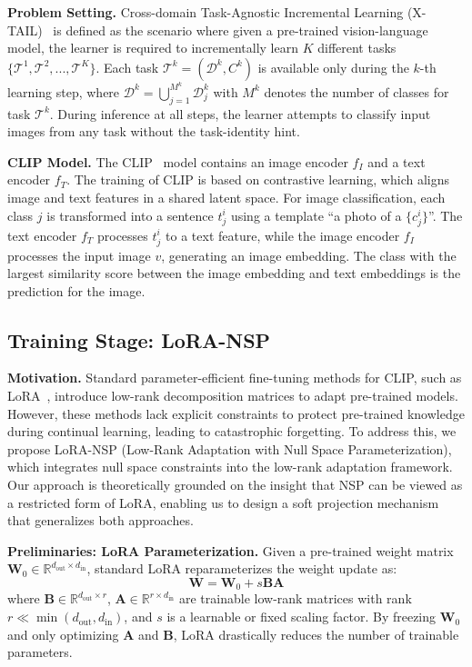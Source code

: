 \documentclass{article}
\begin{document}
\textbf{Problem Setting.}
Cross-domain Task-Agnostic Incremental Learning (X-TAIL)~\cite{xu2024rail} is defined as the scenario where given a pre-trained vision-language model, the learner is required to incrementally learn $K$ different tasks $\{\mathcal{T}^1, \mathcal{T}^2, ..., \mathcal{T}^K\}$. Each task $\mathcal{T}^k = (\mathcal{D}^k, C^k)$ is available only during the $k$-th learning step, where $\mathcal{D}^k = \bigcup_{j=1}^{M^k} \mathcal{D}_j^k$ with $M^k$ denotes the number of classes for task $\mathcal{T}^k$. During inference at all steps, the learner attempts to classify input images from any task without the task-identity hint.

\textbf{CLIP Model.}
The CLIP~\cite{radford2021learning} model contains an image encoder $f_I$ and a text encoder $f_T$. The training of CLIP is based on contrastive learning, which aligns image and text features in a shared latent space. For image classification, each class $j$ is transformed into a sentence $t_j^i$ using a template ``a photo of a $\{c_j^i\}$''. The text encoder $f_T$ processes $t_j^i$ to a text feature, while the image encoder $f_I$ processes the input image $v$, generating an image embedding. The class with the largest similarity score between the image embedding and text embeddings is the prediction for the image.

\subsection{Training Stage: LoRA-NSP}

\textbf{Motivation.}
Standard parameter-efficient fine-tuning methods for CLIP, such as LoRA~\cite{hu2022lora}, introduce low-rank decomposition matrices to adapt pre-trained models. However, these methods lack explicit constraints to protect pre-trained knowledge during continual learning, leading to catastrophic forgetting. To address this, we propose LoRA-NSP (Low-Rank Adaptation with Null Space Parameterization), which integrates null space constraints into the low-rank adaptation framework. Our approach is theoretically grounded on the insight that NSP can be viewed as a restricted form of LoRA, enabling us to design a soft projection mechanism that generalizes both approaches.

\textbf{Preliminaries: LoRA Parameterization.}
Given a pre-trained weight matrix $\mathbf{W}_0 \in \mathbb{R}^{d_{\text{out}} \times d_{\text{in}}}$, standard LoRA reparameterizes the weight update as:
\begin{equation}
    \mathbf{W} = \mathbf{W}_0 + s\mathbf{B}\mathbf{A}
    \label{eq:lora_param}
\end{equation}
where $\mathbf{B} \in \mathbb{R}^{d_{\text{out}} \times r}$, $\mathbf{A} \in \mathbb{R}^{r \times d_{\text{in}}}$ are trainable low-rank matrices with rank $r \ll \min(d_{\text{out}}, d_{\text{in}})$, and $s$ is a learnable or fixed scaling factor. By freezing $\mathbf{W}_0$ and only optimizing $\mathbf{A}$ and $\mathbf{B}$, LoRA drastically reduces the number of trainable parameters.
\end{document}
